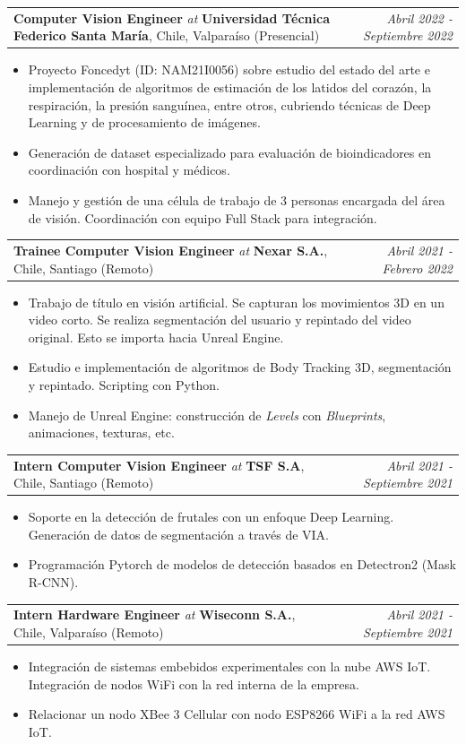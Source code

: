 \documentclass[11pt, letterpaper]{article}
\makeatletter
\newcommand{\experience}[5]{%
  \noindent
  \begin{tabularx}{\linewidth}{@{}X r@{}}
    \textbf{#1} \textit{at} \textbf{#2}, #3 & \textit{#4}
  \end{tabularx}
  \vspace{-10pt}
  #5
  \vspace{2pt}
}
\makeatother
\begin{document}
\experience
  {Computer Vision Engineer}
  {Universidad Técnica Federico Santa María}
  {Chile, Valparaíso (Presencial)}
  {Abril 2022 - Septiembre 2022}
  {
    \begin{itemize}
      \item Proyecto Foncedyt (ID: NAM21I0056) sobre estudio del estado del arte e implementación de algoritmos de estimación de los latidos del corazón, la respiración, la presión sanguínea, entre otros, cubriendo técnicas de Deep Learning y de procesamiento de imágenes.
        \item Generación de dataset especializado para evaluación de bioindicadores en coordinación con hospital y médicos.
        \item Manejo y gestión de una célula de trabajo de 3 personas encargada del área de visión. Coordinación con equipo Full Stack para integración.
    \end{itemize}
  }
\experience
  {Trainee Computer Vision Engineer}
  {Nexar S.A.}
  {Chile, Santiago (Remoto)}
  {Abril 2021 - Febrero 2022}
  {
    \begin{itemize}
        \item Trabajo de título en visión artificial. Se capturan los movimientos 3D en un video corto. Se realiza segmentación del usuario y repintado del video original. Esto se importa hacia Unreal Engine.
        \item Estudio e implementación de algoritmos de Body Tracking 3D, segmentación y repintado. Scripting con Python. 
        \item Manejo de Unreal Engine: construcción de \textit{Levels} con \textit{Blueprints}, animaciones, texturas, etc.
    \end{itemize}
  }
\experience
  {Intern Computer Vision Engineer}
  {TSF S.A}
  {Chile, Santiago (Remoto)}
  {Abril 2021 - Septiembre 2021}
  {
    \begin{itemize}
        \item Soporte en la detección de frutales con un enfoque Deep Learning. Generación de datos de segmentación a través de VIA.                                            
        \item Programación Pytorch de modelos de detección basados en Detectron2 (Mask R-CNN).
    \end{itemize}
  }
\experience
  {Intern Hardware Engineer}
  {Wiseconn S.A.}
  {Chile, Valparaíso (Remoto)}
  {Abril 2021 - Septiembre 2021}
  {
    \begin{itemize}
        \item Integración de sistemas embebidos experimentales con la nube AWS IoT. Integración de nodos WiFi con la red interna de la empresa.
        \item Relacionar un nodo XBee 3 Cellular con nodo ESP8266 WiFi a la red AWS IoT.
    \end{itemize}
  }
\end{document}
